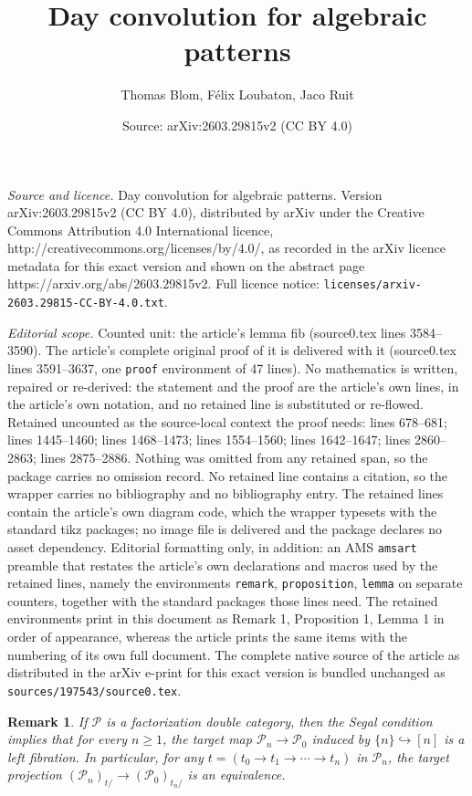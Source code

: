 \documentclass[10pt,a4paper]{amsart}
\title{Day convolution for algebraic patterns}
\author{Thomas Blom, F\'elix Loubaton, Jaco Ruit}
\date{Source: arXiv:2603.29815v2 (CC BY 4.0)}
\newtheorem{remark}{Remark}
\renewcommand{\P}{\mathscr{P}}
\newcommand{\cP}{\P}
\begin{document}
\maketitle

\noindent\emph{Source and licence.} Day convolution for algebraic patterns. Version arXiv:2603.29815v2 (CC BY 4.0), distributed by arXiv under the Creative Commons Attribution 4.0 International licence, http://creativecommons.org/licenses/by/4.0/, as recorded in the arXiv licence metadata for this exact version and shown on the abstract page https://arxiv.org/abs/2603.29815v2. Full licence notice: \texttt{licenses/arxiv-2603.29815-CC-BY-4.0.txt}.\par\smallskip

\noindent\textit{Editorial scope.} Counted unit: the article's lemma fib (source0.tex lines 3584--3590). The article's complete original proof of it is delivered with it (source0.tex lines 3591--3637, one \texttt{proof} environment of 47 lines). No mathematics is written, repaired or re-derived: the statement and the proof are the article's own lines, in the article's own notation, and no retained line is substituted or re-flowed.  Retained uncounted as the source-local context the proof needs: lines 678--681; lines 1445--1460; lines 1468--1473; lines 1554--1560; lines 1642--1647; lines 2860--2863; lines 2875--2886.  Nothing was omitted from any retained span, so the package carries no omission record.  No retained line contains a citation, so the wrapper carries no bibliography and no bibliography entry.  The retained lines contain the article's own diagram code, which the wrapper typesets with the standard tikz packages; no image file is delivered and the package declares no asset dependency.  Editorial formatting only, in addition: an AMS \texttt{amsart} preamble that restates the article's own declarations and macros used by the retained lines, namely the environments \texttt{remark}, \texttt{proposition}, \texttt{lemma} on separate counters, together with the standard packages those lines need.  The retained environments print in this document as Remark 1, Proposition 1, Lemma 1 in order of appearance, whereas the article prints the same items with the numbering of its own full document.  The complete native source of the article as distributed in the arXiv e-print for this exact version is bundled unchanged as \texttt{sources/197543/source0.tex}.
\begin{remark}\label{rem:slices-factorization-double-category}
If $\cP$ is a factorization double category, then the Segal condition implies that for every $n \geq 1$, the target map $\cP_n \to \cP_0$ induced by $\{n\} \hookrightarrow [n]$ is a left fibration.
In particular, for any $t = (t_0 \to t_1 \to \cdots \to t_n)$ in $\cP_n$, the target projection $(\cP_n)_{t/} \to (\cP_0)_{t_n/}$ is an equivalence.
\end{remark}
\end{document}

